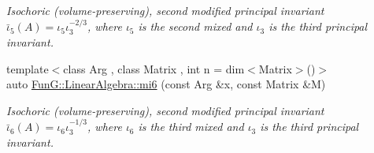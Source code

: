 \begin{DoxyCompactItemize}
\begin{DoxyCompactList}\small\item\em \-Isochoric (volume-\/preserving), second modified principal invariant $ \bar\iota_5(A)=\iota_5\iota_3^{-2/3} $, where $\iota_5$ is the second mixed and $\iota_3$ is the third principal invariant. \end{DoxyCompactList}\item 
{\footnotesize template$<$class Arg , class Matrix , int n = dim$<$\-Matrix$>$()$>$ }\\auto \hyperlink{group__InvariantGroup_ga3e451f9e15fa95080f81d0c0f69f93e6}{\-Fun\-G\-::\-Linear\-Algebra\-::mi6} (const \-Arg \&x, const \-Matrix \&\-M)
\begin{DoxyCompactList}\small\item\em \-Isochoric (volume-\/preserving), second modified principal invariant $ \bar\iota_6(A)=\iota_6\iota_3^{-1/3} $, where $\iota_6$ is the third mixed and $\iota_3$ is the third principal invariant. \end{DoxyCompactList}\end{DoxyCompactItemize}
